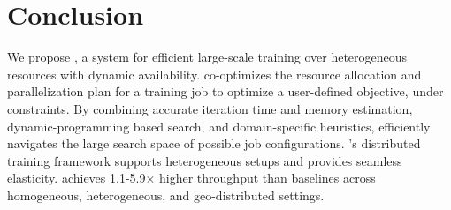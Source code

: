 \section{Conclusion}

We propose \sailor, a system for efficient
large-scale training over heterogeneous resources with dynamic availability. \sailor co-optimizes the resource allocation and parallelization plan for a training job to optimize a user-defined objective, under constraints. By combining accurate iteration time and memory estimation, dynamic-programming based search, and domain-specific heuristics, \sailor efficiently navigates the large search space of possible job configurations. \sailor's distributed training framework supports heterogeneous setups and provides seamless elasticity. \sailor achieves 1.1-5.9$\times$ higher throughput than baselines across homogeneous, heterogeneous, and geo-distributed settings.